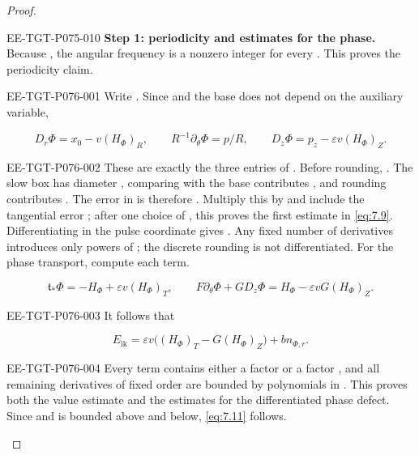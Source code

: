 \begin{proof}
\begin{EESegment}{EE-TGT-P075-010}
\textbf{Step 1: periodicity and estimates for the phase.}
Because , the angular frequency  is a nonzero integer for every . This proves the periodicity claim.
\end{EESegment}
\begin{EESegment}{EE-TGT-P076-001}
Write . Since  and the base does not depend on the auxiliary variable,
\end{EESegment}
\[
D_r\Phi=x_0-v(H_\Phi)_R,\qquad
R^{-1}\partial_\theta\Phi=p/R,\qquad
D_z\Phi=p_z-\varepsilon v(H_\Phi)_Z.
\]
\begin{EESegment}{EE-TGT-P076-002}
These are exactly the three entries of . Before rounding, . The slow box has diameter , comparing with the base contributes , and rounding contributes . The error in  is therefore . Multiply this by  and include the tangential error ; after one choice of , this proves the first estimate in \eqref{eq:7.9}. Differentiating in the pulse coordinate gives . Any fixed number of derivatives introduces only powers of ; the discrete rounding is not differentiated. For the phase transport, compute each term.
\end{EESegment}
\[
\mathfrak t_*\Phi=-H_\Phi+\varepsilon v(H_\Phi)_T,
\qquad
F\partial_\theta\Phi+GD_z\Phi=H_\Phi-\varepsilon vG(H_\Phi)_Z.
\]
\begin{EESegment}{EE-TGT-P076-003}
It follows that
\end{EESegment}
\[
E_{\mathrm{ik}}=\varepsilon v\bigl((H_\Phi)_T-G(H_\Phi)_Z\bigr)+bn_{\Phi,r}.
\]
\begin{EESegment}{EE-TGT-P076-004}
Every term contains either a factor  or a factor , and all remaining derivatives of fixed order are bounded by polynomials in . This proves both the value estimate and the estimates for the differentiated phase defect. Since  and  is bounded above and below, \eqref{eq:7.11} follows.
\end{EESegment}


\end{proof}

